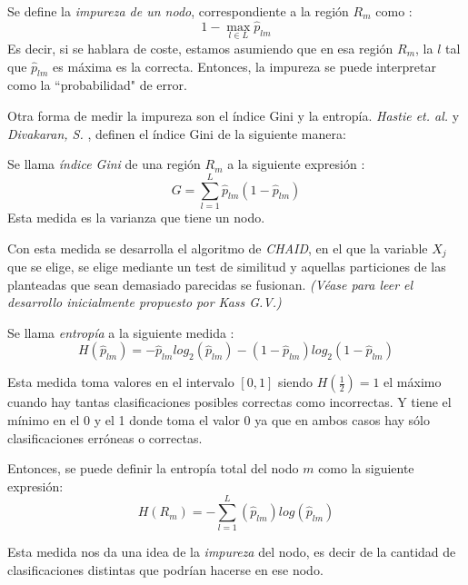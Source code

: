 \begin{defi}
Se define la \emph{impureza de un nodo}, correspondiente a la región $R_m$ como \cite{Brown 2004}:
\begin{equation}
1-\max_{l\in L} \hat{p}_{lm}
\end{equation}
\noindent Es decir, si se hablara de coste, estamos asumiendo que en esa región $R_m$, la $l$ tal que $\hat{p}_{lm}$ es máxima es la correcta. Entonces, la impureza se puede interpretar como la ``probabilidad" de error. 
\end{defi}
\noindent Otra forma de medir la impureza son el índice Gini y la entropía. \emph{Hastie et. al.} y \emph{Divakaran, S.} \cite{Hastie 2001, Divakaran 2022}, definen el índice Gini de la siguiente manera:
\begin{defi}
Se llama \emph{índice Gini} de una región $R_m$ a la siguiente expresión \cite{Hastie 2001, James 2013}:
\begin{equation}
G=\sum_{l=1}^L\hat{p}_{lm}(1-\hat{p}_{lm})
\end{equation}
Esta medida es la varianza que tiene un nodo. 
\end{defi}

\noindent Con esta medida se desarrolla el algoritmo de \emph{CHAID}, en el que la variable $X_j$ que se elige, se elige mediante un test de similitud y aquellas particiones de las planteadas que sean demasiado parecidas se fusionan.   \emph{(Véase \cite{Kass 1980} para leer el desarrollo inicialmente propuesto por Kass G.V.)} 

\begin{defi}
Se llama \emph{entropía} a la siguiente medida \cite{Brown 2004}:
\begin{equation}
H(\hat{p}_{lm})=-\hat{p}_{lm}log_2(\hat{p}_{lm})-(1-\hat{p}_{lm})log_2(1-\hat{p}_{lm})
\end{equation}

\noindent Esta medida toma valores en el intervalo $[0,1]$ siendo $H(\frac{1}{2})=1$ el máximo cuando hay tantas clasificaciones posibles correctas como incorrectas. Y tiene el mínimo en el 0 y el 1 donde toma el valor 0 ya que en ambos casos hay sólo clasificaciones erróneas o correctas.

\noindent Entonces, se puede definir la entropía total del nodo $m$ como la siguiente expresión:
\begin{equation}
H(R_m)=-\sum_{l=1}^L(\hat{p}_{lm})log(\hat{p}_{lm})
\end{equation}

\noindent Esta medida nos da una idea de la \emph{impureza} del nodo, es decir de la cantidad de clasificaciones distintas que podrían hacerse en ese nodo. 
\end{defi}

